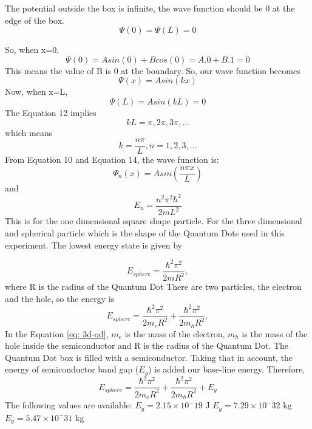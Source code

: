 \documentclass[12pt]{report}
\begin{document}
The potential outside the box is infinite, the wave function should be 0 at the edge of the box. 
\begin{equation}
    \Psi(0) = \Psi(L) = 0
\end{equation}

So, when x=0,
\begin{equation}
    \Psi(0) = Asin(0) + Bcos(0) = A.0 + B.1 = 0
\end{equation}
This means the value of B is 0 at the boundary. So, our wave function becomes
\begin{equation}
    \Psi(x) = Asin(kx)
\end{equation}
Now, when x=L,
\begin{equation}
    \Psi(L) = Asin(kL) = 0
\end{equation}
The Equation 12 implies
\begin{equation}
    kL = \pi, 2\pi, 3\pi, ...
\end{equation}
which means
\begin{equation}
    k = \frac{n\pi}{L}, n=1, 2, 3, ...
\end{equation}
From Equation 10 and Equation 14, the wave function is:
\begin{equation}
    \Psi_n(x) = Asin(\frac{n\pi x}{L})
\end{equation}
and
\begin{equation}
    E_n = \frac{n^2\pi^2\hbar^2}{2mL^2}
\end{equation}
This is for the one dimensional square shape particle. \newpage 
For the three dimensional and spherical particle which is the shape of the Quantum Dots used in this experiment. The lowest energy state is given by 

\begin{equation}
    E_{sphere} = \frac{\hbar^2 \pi^2}{2mR^2},
\end{equation}
where R is the radius of the Quantum Dot
\newline
There are two particles, the electron and the hole, so the energy is
\begin{equation}
    E_{sphere} = \frac{\hbar^2 \pi^2}{2m_eR^2} + \frac{\hbar^2 \pi^2}{2m_hR^2}, \label{eq: 3d-qd}
\end{equation}
In the Equation \eqref{eq: 3d-qd}, $m_e$ is the mass of the electron, $m_h$ is the mass of the hole inside the semiconductor and R is the radius of the Quantum Dot.
\newline
The Quantum Dot box is filled with a semiconductor. Taking that in account, the energy of semiconductor band gap ($E_g$) is added our base-line energy. Therefore, 
\begin{equation}
     E_{sphere} = \frac{\hbar^2 \pi^2}{2m_eR^2} + \frac{\hbar^2 \pi^2}{2m_hR^2} + E_g 
\end{equation}
The following values are available:
\newline
$E_g = 2.15 \times 10^-19$ J
\newline
$E_g = 7.29 \times 10^-32$ kg
\newline
$E_g = 5.47 \times 10^-31$ kg
\end{document}
